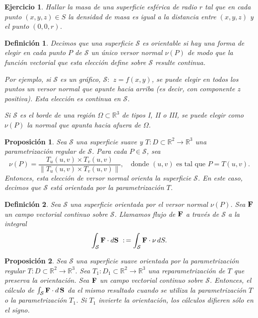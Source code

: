 \documentclass[11pt,a4paper]{amsart}
\newtheorem{definition}{Definición}[section]
\newtheorem{prop}{Proposición}[section]
\newtheorem{ej}{Ejercicio}
\newcommand{\bej}[1]{\begin{ej}\rm{#1}}
\newcommand{\eej}{\end{ej}\vspace{-0.2cm}}
\renewcommand{\bf}{\textbf}
\newcommand{\Su}{\mathcal{S}}
\newcommand{\R}{\mathbb{R}}
\newcommand{\0}{\mathbb{O}}
\newcommand{\8}{\infty}
\begin{document}
\bej  Hallar la masa de una superficie esférica de radio $r$ tal que en
cada punto $(x,y,z)\in S$ la densidad de masa es igual a la distancia entre $%
(x,y,z)$ y el punto $(0,0,r)$.
\eej

\begin{definition} Decimos que una superficie  $\Su$ es orientable si hay una forma de elegir
en cada punto $P$ de $\Su$ un único versor normal $\nu(P)$ de modo que la función vectorial
que esta elección define sobre $\Su$ resulte continua.

Por ejemplo, si $\Su$ es un gráfico, $\Su:\ \,z=f(x,y)$, se puede elegir en todos los puntos un versor normal
que apunte hacia arriba (es decir, con componente $z$ positiva). Esta elección es continua en $\Su$.

Si $\Su$ es el borde de una región $\Omega\subset \R^3$ de tipos I, II o III, se puede elegir como $\nu(P)$ la normal
que apunta hacia afuera de $\Omega$.
\end{definition}

\begin{prop}\label{orient} Sea $\Su$ una superficie suave y $T:D\subset\R^2\to\R^3$ una parametrización regular de $\Su$.
Para cada $P\in\Su$, sea
\[
\nu(P)=\frac{T_u(u,v)\times T_v(u,v)}{\|T_u(u,v)\times T_v(u,v)\|},\quad\mbox{donde }(u,v)\mbox{ es tal que }P=T(u,v).
\]
Entonces, esta elección de versor normal orienta la superficie $\Su$. En este caso, decimos que $\Su$ está orientada por la parametrización
$T$.
\end{prop}

\begin{definition} Sea $\Su$ una superficie orientada por el versor normal $\nu(P)$. Sea $\mbox{\rm\bf F}$ un campo vectorial continuo
sobre $\Su$. Llamamos flujo de $\mbox{\rm\bf F}$ a través de $\Su$ a la integral
\[
\int_\Su {\mbox{\rm\bf F}}\cdot d{\mbox{\rm\bf S}} \ :\,=\int_\Su {\mbox{\rm\bf F}}\cdot\nu\,dS.
\]
\end{definition}

\begin{prop}\label{nodepen2} Sea $\Su$ una superficie suave orientada por la parametrización regular $T:D\subset\R^2\to\R^3$.
Sea $T_1:D_1\subset
\R^2\to\R^3$ una reparametrización de $T$ que preserva la orientación. Sea $\mbox{\rm\bf F}$ un campo vectorial continuo
sobre $\Su$. Entonces, el cálculo de $\int_\Su {\mbox{\rm\bf F}}\cdot d\,{\mbox{\rm\bf S}}$ da el mismo resultado cuando
se utiliza la parametrización $T$ o la parametrización $T_1$. Si $T_1$ invierte la orientación, los cálculos difieren sólo
en el signo.
\end{prop}
\end{document}
